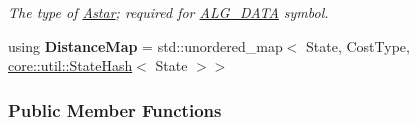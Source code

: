 \begin{DoxyCompactItemize}
\begin{DoxyCompactList}\small\item\em The type of \hyperlink{structslb_1_1ext_1_1algorithm_1_1Astar}{Astar}; required for \hyperlink{algorithm_8h_a64c012078deee9a30405e18ec11e6360}{A\+L\+G\+\_\+\+D\+A\+TA} symbol. \end{DoxyCompactList}\item 
using {\bfseries Distance\+Map} = std\+::unordered\+\_\+map$<$ State, Cost\+Type, \hyperlink{structslb_1_1core_1_1util_1_1StateHash}{core\+::util\+::\+State\+Hash}$<$ State $>$$>$\hypertarget{structslb_1_1ext_1_1algorithm_1_1Astar_a210d1f8bc1c2e97e626deb1051de2b2b}{}\label{structslb_1_1ext_1_1algorithm_1_1Astar_a210d1f8bc1c2e97e626deb1051de2b2b}

\end{DoxyCompactItemize}
\subsubsection*{Public Member Functions}

